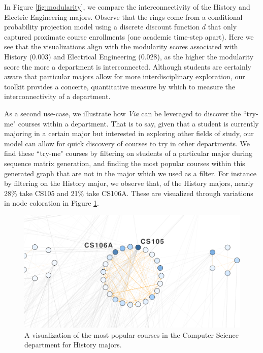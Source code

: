 \documentclass{sigchi}
\begin{document}
In Figure \ref{fig:modularity}, we compare the interconnectivity of the History and Electric Engineering majors.  Observe that the rings come from a conditional probability projection model using a discrete discount function $d$ that only captured proximate course enrollments (one academic time-step apart). Here we see that the visualizations align with the modularity scores associated with History (0.003) and Electrical Engineering (0.028), as the higher the modularity score the more a department is interconnected. Although students are certainly aware that particular majors allow for more interdisciplinary exploration, our toolkit provides a concerte, quantitative measure by which to measure the interconnectivity of a department.

As a second use-case, we illustrate how \textit{Via} can be leveraged to discover the ``try-me" courses within a department. That is to say, given that a student is currently majoring in a certain major but interested in exploring other fields of study, our model can allow for quick discovery of courses to try in other departments. We find these ``try-me" courses by filtering on students of a particular major during sequence matrix generation, and finding the most popular courses within this generated graph that are not in the major which we used as a filter. For instance by filtering on the History major, we observe that, of the History majors, nearly 28\% take CS105 and 21\% take CS106A. These are visualized through variations in node coloration in Figure \ref{fig:history-try-me}.

\begin{figure}[h]
    \centering
    \includegraphics[width=.9\columnwidth]{final-history-try-me.pdf}
    \caption{A visualization of the most popular courses in the Computer Science department for History majors.}
    \label{fig:history-try-me}
\end{figure}
\end{document}
